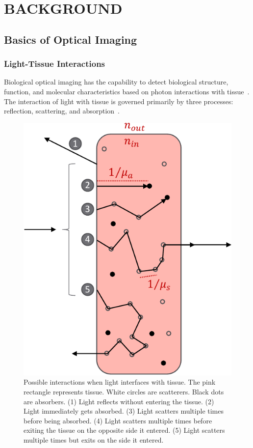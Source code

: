 
\chapter{BACKGROUND} %
\label{chap:background}



\section{Basics of Optical Imaging}
\label{chap:background:basics}

\subsection{Light-Tissue Interactions}
Biological optical imaging has the capability to detect biological structure, function, and molecular characteristics based on photon interactions with tissue~\cite{Wang2009}. The interaction of light with tissue is governed primarily by three processes: reflection, scattering, and absorption~\cite{Welch2010}.

\begin{figure}
    \begin{center}
    \includegraphics[width=.35\textwidth]{fig/background/lightinteraction.pdf}
    \end{center}
    \caption{Possible interactions when light interfaces with tissue. The pink rectangle represents tissue. White circles are scatterers. Black dots are absorbers.  (1) Light reflects without entering the tissue. (2) Light immediately gets absorbed. (3) Light scatters multiple times before being absorbed. (4) Light scatters multiple times before exiting the tissue on the opposite side it entered. (5) Light scatters multiple times but exits on the side it entered. } 
    \label{fig:lightinteraction}
\end{figure} 

